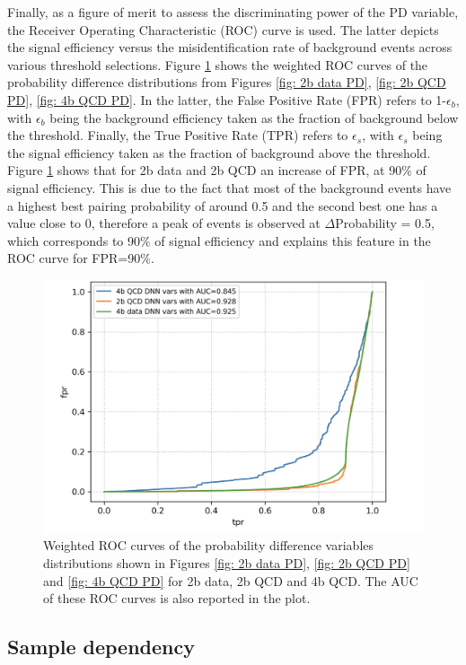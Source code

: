 Finally, as a figure of merit to assess the discriminating power of the PD variable, the Receiver Operating Characteristic (ROC) curve is used. The latter depicts the signal efficiency versus the misidentification rate of background events across various threshold selections. Figure \ref{fig: ROC PD} shows the weighted ROC curves of the probability difference distributions from Figures \ref{fig: 2b data PD}, \ref{fig: 2b QCD PD}, \ref{fig: 4b QCD PD}. In the latter, the False Positive Rate (FPR) refers to 1-$\epsilon_b$, with $\epsilon_b$ being the background efficiency taken as the fraction of background below the threshold. Finally, the True Positive Rate (TPR) refers to $\epsilon_s$, with $\epsilon_s$ being the signal efficiency taken as the fraction of background above the threshold. Figure \ref{fig: ROC PD} shows that for 2b data and 2b QCD an increase of FPR, at 90\% of signal efficiency. This is due to the fact that most of the background events have a highest best pairing probability of around 0.5 and the second best one has a value close to 0, therefore a peak of events is observed at $\Delta$Probability = 0.5, which corresponds to 90\% of signal efficiency and explains this feature in the ROC curve for FPR=90\%.

\begin{figure}
    \centering
    \includegraphics[width=0.7\linewidth]{Images/7.S:B/Prob diff/Probability difference ROC curve.png}
    \caption{Weighted ROC curves of the probability difference variables distributions shown in Figures \ref{fig: 2b data PD}, \ref{fig: 2b QCD PD} and \ref{fig: 4b QCD PD} for 2b data, 2b QCD and 4b QCD. The AUC of these ROC curves is also reported in the plot.}
    \label{fig: ROC PD}
\end{figure}

\clearpage

\subsection{Sample dependency} \label{subsection: sample dep}

